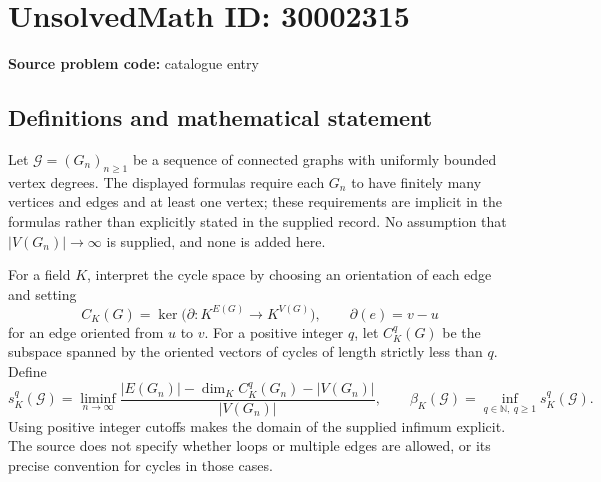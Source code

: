 \documentclass[11pt]{article}
\newcommand{\N}{\mathbb{N}}
\begin{document}
\section*{UnsolvedMath ID: 30002315}
\textbf{Source problem code:} catalogue entry
\subsection{Definitions and mathematical statement}
Let \(\mathcal G=(G_n)_{n\geq 1}\) be a sequence of connected graphs with uniformly bounded vertex degrees. The displayed formulas require each \(G_n\) to have finitely many vertices and edges and at least one vertex; these requirements are implicit in the formulas rather than explicitly stated in the supplied record. No assumption that \(|V(G_n)|\to\infty\) is supplied, and none is added here.

For a field \(K\), interpret the cycle space by choosing an orientation of each edge and setting
\[
C_K(G)=\ker\bigl(\partial:K^{E(G)}\longrightarrow K^{V(G)}\bigr),
\qquad \partial(e)=v-u
\]
for an edge oriented from \(u\) to \(v\). For a positive integer \(q\), let \(C_K^q(G)\) be the subspace spanned by the oriented vectors of cycles of length strictly less than \(q\). Define
\[
s_K^q(\mathcal G)=\liminf_{n\to\infty}
\frac{|E(G_n)|-\dim_K C_K^q(G_n)-|V(G_n)|}{|V(G_n)|},
\qquad
\beta_K(\mathcal G)=\inf_{q\in\N,\ q\geq 1}s_K^q(\mathcal G).
\]
Using positive integer cutoffs makes the domain of the supplied infimum explicit. The source does not specify whether loops or multiple edges are allowed, or its precise convention for cycles in those cases.
\end{document}
